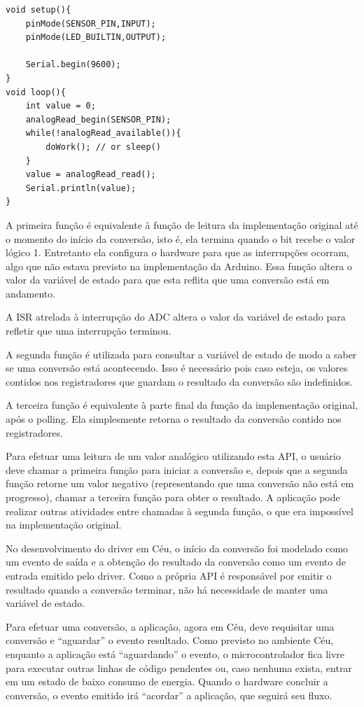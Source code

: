 \documentclass[11pt]{article}
\begin{document}
\begin{lstlisting}[style=CStyle,label=analognonblockapp,caption=Aplicação utilizando driver não-bloqueante]
void setup(){
    pinMode(SENSOR_PIN,INPUT);
    pinMode(LED_BUILTIN,OUTPUT);

    Serial.begin(9600);
}
void loop(){
    int value = 0;
    analogRead_begin(SENSOR_PIN);
    while(!analogRead_available()){
        doWork(); // or sleep()
    }
    value = analogRead_read();
    Serial.println(value);
}
\end{lstlisting}
\par A primeira função é equivalente à função de leitura da implementação original até o momento do início da conversão, isto é, ela termina quando o bit recebe o valor lógico 1. Entretanto ela configura  o hardware para que as interrupções ocorram, algo que não estava previsto na implementação da Arduino. Essa função altera o valor da variável de estado para que esta reflita que uma conversão está em andamento.
\par A ISR atrelada à interrupção do ADC altera o valor da variável de estado para refletir que uma interrupção terminou.
\par A segunda função é utilizada para consultar a variável de estado de modo a saber se uma conversão está acontecendo. Isso é necessário pois caso esteja, os valores contidos nos registradores que guardam o resultado da conversão são indefinidos.
\par A terceira função é equivalente à parte final da função da implementação original, após o polling. Ela simplesmente retorna o resultado da conversão contido nos registradores.
\par Para efetuar uma leitura de um valor analógico utilizando esta API, o usuário deve chamar a primeira função para iniciar a conversão e, depois que a segunda função retorne um valor negativo (representando que uma conversão não está em progresso), chamar a terceira função para obter o resultado. A aplicação pode realizar outras atividades entre chamadas à segunda função, o que era impossível na implementação original.
\par No desenvolvimento do driver em Céu, o início da conversão foi modelado como um evento de saída e a obtenção do resultado da conversão como um evento de entrada emitido pelo driver. Como a própria API é responsável por emitir o resultado quando a conversão terminar, não há necessidade de manter uma variável de estado. 
\par Para efetuar uma conversão, a aplicação, agora em Céu, deve requisitar uma conversão e “aguardar” o evento resultado. Como previsto no ambiente Céu, enquanto a aplicação está “aguardando” o evento, o microcontrolador fica livre para executar outras linhas de código pendentes ou, caso nenhuma exista, entrar em um estado de baixo consumo de energia. Quando o hardware concluir a conversão, o evento emitido irá “acordar” a aplicação, que seguirá seu fluxo.
\end{document}
